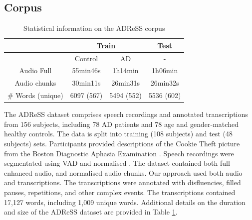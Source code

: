 \subsection{Corpus}
\begin{table}[]
  \begin{center}
   \begin{tabular}{c|ccc}
    \hline
                    & \multicolumn{2}{c}{Train} & Test       \\\hline
                    & Control     & AD          & -          \\
  Audio Full        & 55min46s    & 1h14min     & 1h06min    \\
  Audio chunks      & 30min11s    & 26min31s    & 26min32s   \\
  \# Words (unique) & 6097 (567)  & 5494 (552)  & 5536 (602) \\ \hline
  \end{tabular}
  \caption{Statistical information on the ADReSS corpus}
  \label{tab:adress_data}
  \end{center}
  \end{table}
The ADReSS dataset comprises speech recordings and annotated transcriptions from 156 subjects, including 78 \ac{AD} patients and 78 age and gender-matched healthy controls. The data is split into training (108 subjects) and test (48 subjects) sets. Participants provided descriptions of the Cookie Theft picture from the Boston Diagnostic Aphasia Examination \cite{goodglass2001bdae}. Speech recordings were segmentated using \ac{VAD} and normalised \cite{luz2020alzheimer}. The dataset contained both full enhanced audio, and normalised audio chunks. Our approach used both audio and transcriptions. The transcriptions were annotated with disfluencies, filled pauses, repetitions, and other complex events. The transcriptions contained 17,127 words, including 1,009 unique words. Additional details on the duration and size of the ADReSS dataset are provided in Table \ref{tab:adress_data}.
